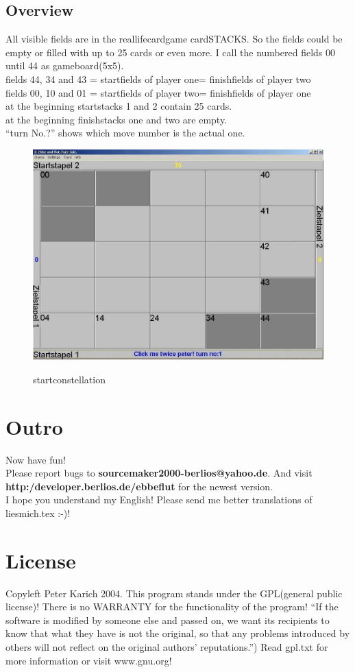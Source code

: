 \documentclass[12pt]{article}
\begin{document}
\subsection{Overview}
All visible fields are in the reallifecardgame cardSTACKS. So the fields could be empty or filled with up to 25 
cards or even more.
I call the numbered fields 00 until 44 as gameboard(5x5).\\
fields 44, 34 and 43 = startfields of player one= finishfields of player two\\
fields 00, 10 and 01 = startfields of player two= finishfields of player one\\
at the beginning startstacks 1 and 2 contain 25 cards.\\
at the beginning finishstacks one and two are empty.\\
"`turn No.?"' shows which move number is the actual one.
\begin{figure}[ht]
\includegraphics[scale=0.5]{overview.jpg}
\label{overview}
\caption{startconstellation}
\end{figure}
\section{Outro}
Now have fun!\\
Please report bugs to {\bf sourcemaker2000-berlios@yahoo.de}. And visit {\bf http:/developer.berlios.de/ebbeflut} for the newest version.\\
I hope you understand my English! Please send me better translations of liesmich.tex :-)!
\section{License}
Copyleft Peter Karich 2004. This program stands under the GPL(general public license)! 
There is no WARRANTY for the functionality of the program!
 "`If the software is modified by someone else and passed on, we want its
recipients to know that what they have is not the original, so that any problems
introduced by others will not reflect on the original authors' reputations."')
Read gpl.txt for more information or visit www.gnu.org!
\end{document}
